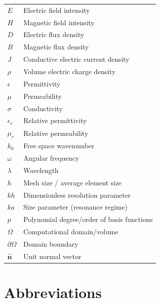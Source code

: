 \documentclass[12pt, a4paper]{report}
\begin{document}
\begin{tabular}{@{} p{3cm} p{11cm} @{}}
$E$ & Electric field intensity \\[0.3em]
$H$ & Magnetic field intensity \\[0.3em]
$D$ & Electric flux density \\[0.3em]
$B$ & Magnetic flux density \\[0.3em]
$J$ & Conductive electric current density \\[0.3em]
$\rho$ & Volume electric charge density \\[0.3em]
$\epsilon$ & Permittivity \\[0.3em]
$\mu$ & Permeability \\[0.3em]
$\sigma$ & Conductivity \\[0.3em]
$\epsilon_r$ & Relative permittivity \\[0.3em]
$\mu_r$ & Relative permeability \\[0.3em]
$k_0$ & Free space wavenumber \\[0.3em]
$\omega$ & Angular frequency \\[0.3em]
$\lambda$ & Wavelength \\[0.3em]
$h$ & Mesh size / average element size \\[0.3em]
$kh$ & Dimensionless resolution parameter \\[0.3em]
$ka$ & Size parameter (resonance regime) \\[0.3em]
$p$ & Polynomial degree/order of basis functions \\[0.3em]
$\Omega$ & Computational domain/volume \\[0.3em]
$\partial\Omega$ & Domain boundary \\[0.3em]
$\hat{\bm{n}}$ & Unit normal vector \\[0.3em]
\end{tabular}

\vspace{1.5cm}

\section*{Abbreviations}
\end{document}

